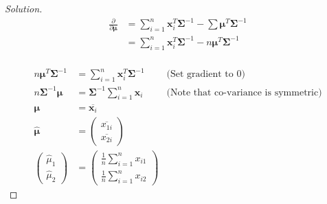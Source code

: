 \documentclass{article}
\newenvironment{solution}
  {\renewcommand\qedsymbol{$\blacksquare$}\begin{proof}[Solution]$ $}
  {\end{proof}}
\newcommand{\vect}[1]{\boldsymbol{#1}}
\begin{document}
\begin{Exercise}
\begin{solution}
        \begin{align*}
            \frac{\partial}{\partial \vect \mu} & = \sum_{i=1}^n \vect{x}_i^T \vect{\Sigma}^{-1} - \sum \vect \mu^T \vect \Sigma^{-1} \\
                                                & = \sum_{i=1}^n \vect{x}_i^T \vect{\Sigma}^{-1} - n \vect \mu^T \vect \Sigma^{-1}    \\
        \end{align*}

        \begin{align*}
            n \vect \mu^T \vect \Sigma^{-1}                            & = \sum_{i=1}^n \vect{x}_i^T \vect{\Sigma}^{-1} & \text{(Set gradient to 0)}                  \\
            n \vect \Sigma^{-1} \vect \mu                              & = \vect{\Sigma}^{-1} \sum_{i=1}^n \vect{x}_i   & \text{(Note that co-variance is symmetric)} \\
            \vect \mu                                                  & = \overline{\vect{x}_i}                                                                      \\
            \hat {\vect \mu}                                           & = \begin{pmatrix}
                                                                               \overline{x_{1i}} \\
                                                                               \overline{x_{2i}}
                                                                           \end{pmatrix}                                                   \\
            \begin{pmatrix} \hat {\mu}_1 \\ \hat {\mu}_2 \end{pmatrix} & = \begin{pmatrix}
                                                                               \frac{1}{n} \sum_{i=1}^{n} x_{i1} \\
                                                                               \frac{1}{n} \sum_{i=1}^{n}  x_{i2}
                                                                           \end{pmatrix}
        \end{align*}


\end{solution}
\end{Exercise}
\end{document}
